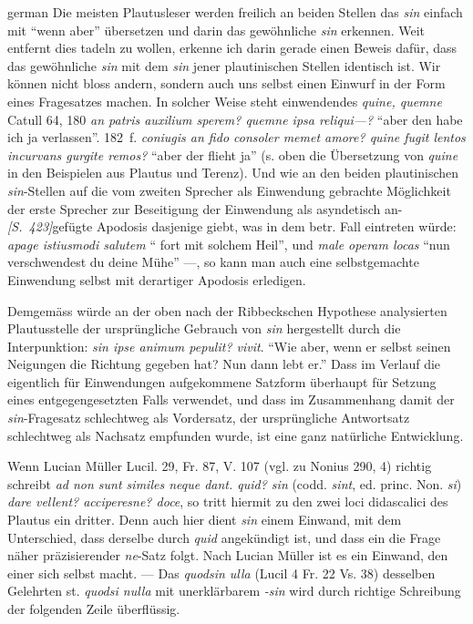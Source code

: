 \begin{otherlanguage*}{german}
Die meisten Plautusleser werden freilich an beiden Stellen das \emph{sin} einfach mit “wenn aber” übersetzen und darin das gewöhnliche \emph{sin} erkennen. Weit entfernt dies tadeln zu wollen, erkenne ich darin gerade einen Beweis dafür, dass das gewöhnliche \emph{sin} mit dem \emph{sin} jener plautinischen Stellen identisch ist. Wir können nicht bloss andern, sondern auch uns selbst einen Einwurf in der Form eines Fragesatzes machen. In solcher Weise steht einwendendes \emph{quine, quemne} Catull 64, 180 \emph{an patris auxilium sperem? quemne ipsa reliqui—?} “aber den habe ich ja verlassen”. 182~f. \emph{coniugis an fido consoler memet amore? quine fugit lentos incurvans gurgite remos?} “aber der flieht ja” (s. oben die Übersetzung von \emph{quine} in den Beispielen aus Plautus und Terenz). Und wie an den beiden plautinischen \emph{sin}-Stellen auf die vom zweiten Sprecher als Einwendung gebrachte Möglichkeit der erste Sprecher zur Beseitigung der Einwendung als asyndetisch an-\hypertarget{p423}{\emph{[S.~423]}}\label{p423}gefügte Apodosis dasjenige giebt, was in dem betr. Fall eintreten würde: \emph{apage istiusmodi salutem} “ fort mit solchem Heil”, und \emph{male operam locas} “nun  verschwendest du deine Mühe” —, so kann man auch eine selbstgemachte Einwendung selbst mit derartiger Apodosis erledigen.

Demgemäss würde an der oben nach der Ribbeckschen Hypothese analysierten Plautusstelle der ursprüngliche Gebrauch von \emph{sin} hergestellt durch die Interpunktion: \emph{sin ipse animum pepulit? vivit}. “Wie aber, wenn er selbst seinen Neigungen die Richtung gegeben hat? Nun dann lebt er.” Dass im Verlauf die eigentlich für Einwendungen aufgekommene Satzform überhaupt für Setzung eines entgegengesetzten Falls verwendet, und dass im Zusammenhang damit der \emph{sin}-Fragesatz schlechtweg als Vordersatz, der ursprüngliche Antwortsatz schlechtweg als Nachsatz empfunden wurde, ist eine ganz natürliche Entwicklung.

Wenn Lucian Müller Lucil. 29, Fr. 87, V. 107 (vgl. zu Nonius 290, 4) richtig schreibt \emph{ad non sunt similes neque dant. quid? sin} (codd. \emph{sint}, ed. princ. Non. \emph{si}) \emph{dare vellent? acciperesne? doce}, so tritt hiermit zu den zwei loci didascalici des Plautus ein dritter. Denn auch hier dient \emph{sin} einem Einwand, mit dem Unterschied, dass derselbe durch \emph{quid} angekündigt ist, und dass ein die Frage näher präzisierender \emph{ne}-Satz folgt. Nach Lucian Müller ist es ein Einwand, den einer sich selbst macht. — Das \emph{quodsin ulla} (Lucil 4 Fr. 22 Vs. 38) desselben Gelehrten st. \emph{quodsi nulla} mit unerklärbarem \emph{-sin} wird durch richtige Schreibung der folgenden Zeile überflüssig.


\end{otherlanguage*}
